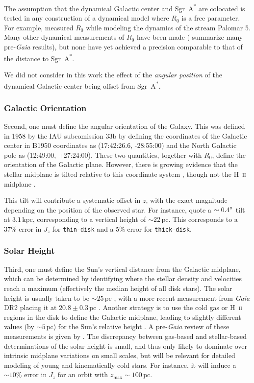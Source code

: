 \documentclass[twocolumn]{aastex62}
\newcommand{\pc}{\text{pc}}
\newcommand{\kpc}{\text{kpc}}
\newcommand{\sgra}{Sgr~A\textsuperscript{*}}
\newcommand{\thin}{\texttt{thin-disk}}
\newcommand{\thick}{\texttt{thick-disk}}
\begin{document}
The assumption that the dynamical Galactic center and \sgra{} are colocated is
tested in any construction of a dynamical model where $R_0$ is a free
parameter. For example, \citet{2015ApJ...803...80K} measured $R_0$ while
modeling the dynamics of the stream Palomar 5. Many other dynamical
measurements of $R_0$ have been made (\citealt{2016ARAA..54..529B} summarize
many pre-\textit{Gaia} results), but none have yet achieved a precision
comparable to that of the distance to \sgra{}.

We did not consider in this work the effect of the \emph{angular position} of
the dynamical Galactic center being offset from
\sgra{}.

\subsubsection{Galactic Orientation}
Second, one must define the angular orientation of the Galaxy. This was
defined in 1958 by the IAU subcomission 33b \citep{1960MNRAS.121..123B} by
defining the coordinates of the Galactic center in B1950 coordinates as
(17:42:26.6, -28:55:00) and the North Galactic pole as (12:49:00, +27:24:00).
These two quantities, together with $R_0$, define the orientation of the
Galactic plane. However, there is growing evidence that the stellar midplane
is tilted relative to this coordinate system \citep{2014ApJ...797...53G,
2016ARAA..54..529B}, though not the H~\textsc{ii} midplane
\citep{2019ApJ...871..145A}.

This tilt will contribute a systematic offset in $z$, with the exact magnitude
depending on the position of the observed star. For instance,
\citet{2014ApJ...797...53G} quote a $\sim0.4\degree$ tilt at $3.1\,\kpc$,
corresponding to a vertical height of $\sim22\,\pc$. This corresponds to a
$37\%$ 
error in $J_z$ for \thin{} and a 5\% error for \thick{}.

\subsubsection{Solar Height}
Third, one must define the Sun's vertical distance from the Galactic midplane,
which can be determined by identifying where the stellar density and
velocities reach a maximum (effectively the median height of all disk stars).
The solar height is usually taken to be $\sim 25\,\pc$
\citep{2001ApJ...553..184C}, with a more recent measurement from \textit{Gaia}
DR2 placing it at $20.8 \pm 0.3\,\pc$ \citep{2019MNRAS.482.1417B}. Another
strategy is to use the cold gas or H~\textsc{ii} regions in the disk to define
the Galactic midplane, leading to slightly different values (by $\sim 5\,\pc$)
for the Sun's relative height \citep[e.g.,][]{2019ApJ...871..145A}. A
pre-\textit{Gaia} review of these measurements is given by
\citet{2016ARAA..54..529B}. The discrepancy between gas-based and
stellar-based determinations of the solar height is small, and thus
only likely to dominate over intrinsic midplane variations on small
scales, but will be relevant for detailed modeling of young and
kinematically cold stars. For instance, it will induce a $\sim10\%$
error in $J_z$ for an orbit with $z_{\text{max}}\sim100\,\pc$.
\end{document}
